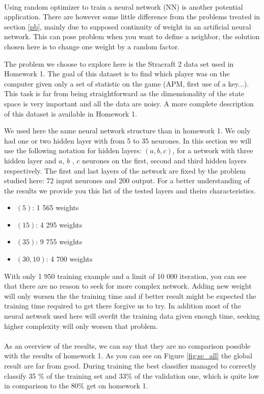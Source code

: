 \documentclass[twocolumn,a4paper,10pt]{article}
\begin{document}
\paragraph{}
Using random optimizer to train a neural network (NN) is another potential application. There are however some little difference from the problems treated in section \ref{pb}, mainly due to supposed continuity of weight in an artificial neural network. This can pose problem when you want to define a neighbor, the solution chosen here is to change one weight by a random factor.

The problem we choose to explore here is the Stracraft 2 data set used in Homework 1. The goal of this dataset is to find which player was on the computer given only a set of statistic on the game (APM, first use of a key...). This task is far from being straightforward as the dimensionality of the state space is very important and all the data are noisy. A more complete description of this dataset is available in Homework 1.

We used here the same neural network structure than in homework 1. We only had one or two hidden layer with from 5 to 35 neurones. In this section we will use the following notation for hidden layers: $(a,b,c)$, for a network with three hidden layer and $a$, $b$ , $c$ neurones on the first, second and third hidden layers respectively. The first and last layers of the network are fixed by the problem studied here: 72 input neurones and 200 output. For a better understanding of the results we provide you this list of the tested layers and theirs characteristics.

\begin{itemize}
  \item $(5)$: 1 565 weights
  \item $(15)$: 4 295 weights
  \item $(35)$: 9 755 weights
  \item $(30,10)$: 4 700 weights
\end{itemize}

With only 1 950 training example and a limit of 10 000 iteration, you can see that there are no reason to seek for more complex network. Adding new weight will only worsen the the training time and if better result might be expected the training time required to get there forgive us to try. In addition most of the neural network used here will overfit the training data given enough time, seeking higher complexity will only worsen that problem.

\paragraph{}
As an overview of the results, we can say that they are no comparison possible with the results of homework 1. As you can see on Figure \ref{fig:sc_all} the global result are far from good. During training the best classifier managed to correctly classify 35 \% of the training set and 33\% of the validation one, which is quite low in comparison to the 80\% get on homework 1.
\end{document}
